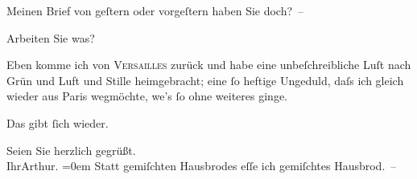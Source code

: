 \pstart
           Meinen Brief von geſtern oder vorgeſtern haben Sie doch? –\pend
           
\pstart
           Arbeiten Sie was?\pend
           
\pstart
           Eben komme ich von \textsc{Versailles} zurück und habe eine unbeſchreibliche Luſt nach Grün und Luft und Stille
                  heimge{\pb}bracht; eine ſo heftige Ungeduld, daſs ich
               gleich wieder aus Paris wegmöchte, we{\geminationn}’s ſo ohne
               weiteres ginge.\pend
           
\pstart
           Das gibt ſich wieder.\pend
           
\pstart
           Seien Sie herzlich gegrüßt.{\\[\baselineskip]}Ihr\spacefill\mbox{Arthur.}\pend
           \leftskip=0em{}
\pstart
           \noindent{}Statt gemiſchten Hausbrodes eſſe ich gemiſchtes Hausbrod. –\pend
           \endnumbering{}  
      